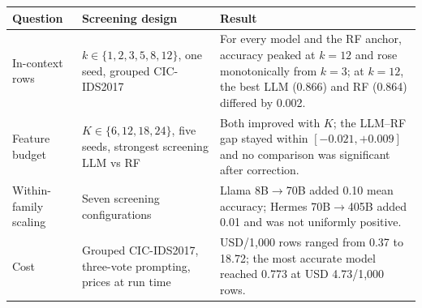 \begin{tabular}{@{}p{}p{}p{}@{}}
\toprule
Question & Screening design & Result \\
\midrule
In-context rows & $k\in\{1,2,3,5,8,12\}$, one seed, grouped CIC-IDS2017 & For every model and the RF anchor, accuracy peaked at $k=12$ and rose monotonically from $k=3$; at $k=12$, the best LLM (0.866) and RF (0.864) differed by 0.002. \\
Feature budget & $K\in\{6,12,18,24\}$, five seeds, strongest screening LLM vs RF & Both improved with $K$; the LLM--RF gap stayed within $[-0.021,+0.009]$ and no comparison was significant after correction. \\
Within-family scaling & Seven screening configurations & Llama 8B$\rightarrow$70B added 0.10 mean accuracy; Hermes 70B$\rightarrow$405B added 0.01 and was not uniformly positive. \\
Cost & Grouped CIC-IDS2017, three-vote prompting, prices at run time & USD/1,000 rows ranged from 0.37 to 18.72; the most accurate model reached 0.773 at USD 4.73/1,000 rows. \\
\bottomrule
\end{tabular}
